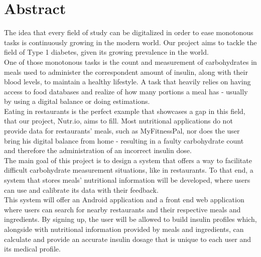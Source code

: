 %
%

\chapter*{Abstract}
    The idea that every field of study can be digitalized in order to ease 
    monotonous tasks is continuously growing in the modern world. Our project
    aims to tackle the field of Type 1 diabetes, given its growing prevalence in the world.\\

    One of those monotonous tasks is the count and measurement of carbohydrates in meals used to
    administer the correspondent amount of insulin, along with their blood levels, to maintain a healthy lifestyle.
    A task that heavily relies on having access to food databases and realize of how many portions a meal has - usually
    by using a digital balance or doing estimations.\\

    Eating in restaurants is the perfect example that showcases a gap in this field, that our project, 
    Nutr.io, aims to fill.  Most nutritional applications do not provide data for restaurants' meals,
    such as MyFitnessPal, nor does the user bring his digital balance from home - resulting in a faulty
    carbohydrate count and therefore the administration of an incorrect insulin dose.\\

    The main goal of this project is to design a system that offers a way to facilitate difficult
    carbohydrate measurement situations, like in restaurants.
    To that end, a system that stores meals' nutritional information will be developed, 
    where users can use and calibrate its data with their feedback.\\

    This system will offer an Android application and a front end web application where users can search for 
    nearby restaurants and their respective meals and ingredients. By signing up, the user will be allowed to build
    insulin profiles which, alongside with nutritional information provided by meals and ingredients,
    can calculate and provide an accurate insulin dosage that is unique to each user and its medical profile.\\